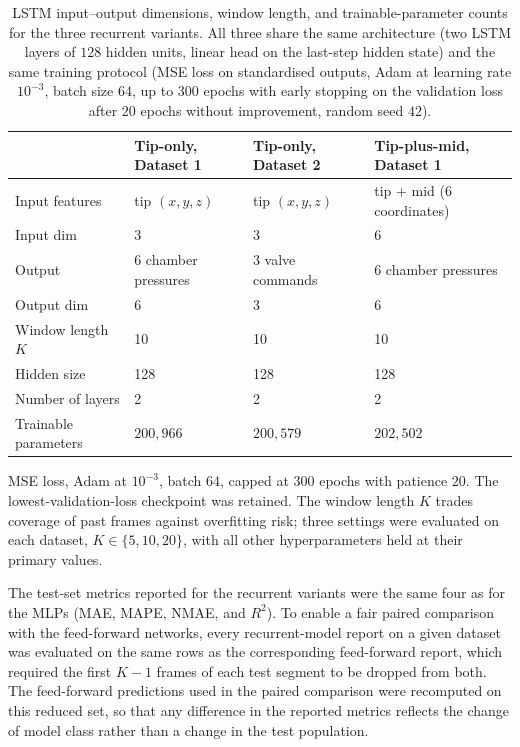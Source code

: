 \begin{table}[ht]
\centering
\caption[LSTM configurations for the three recurrent variants.]{LSTM input--output dimensions, window length, and trainable-parameter counts for the three recurrent variants. All three share the same architecture (two LSTM layers of $128$ hidden units, linear head on the last-step hidden state) and the same training protocol (MSE loss on standardised outputs, Adam at learning rate $10^{-3}$, batch size $64$, up to $300$ epochs with early stopping on the validation loss after $20$ epochs without improvement, random seed $42$).}
\label{tab:lstm_config}
\begin{tabularx}{\linewidth}{@{}l X X X@{}}
\toprule
                      & Tip-only, Dataset 1    & Tip-only, Dataset 2    & Tip-plus-mid, Dataset 1 \\
\midrule
Input features        & tip $(x,y,z)$          & tip $(x,y,z)$          & tip + mid ($6$ coordinates) \\
Input dim             & 3                       & 3                       & 6 \\
Output                & 6 chamber pressures    & 3 valve commands        & 6 chamber pressures \\
Output dim            & 6                       & 3                       & 6 \\
Window length $K$     & 10                      & 10                      & 10 \\
Hidden size           & 128                     & 128                     & 128 \\
Number of layers      & 2                       & 2                       & 2 \\
Trainable parameters  & $200{,}966$             & $200{,}579$             & $202{,}502$ \\
\bottomrule
\end{tabularx}
\end{table}

MSE loss, Adam at $10^{-3}$, batch $64$, capped at $300$ epochs with patience $20$. The lowest-validation-loss checkpoint was retained. The window length $K$ trades coverage of past frames against overfitting risk; three settings were evaluated on each dataset, $K \in \{5, 10, 20\}$, with all other hyperparameters held at their primary values.


The test-set metrics reported for the recurrent variants were the same four as for the MLPs (MAE, MAPE, NMAE, and $R^{2}$). To enable a fair paired comparison with the feed-forward networks, every recurrent-model report on a given dataset was evaluated on the same rows as the corresponding feed-forward report, which required the first $K-1$ frames of each test segment to be dropped from both. The feed-forward predictions used in the paired comparison were recomputed on this reduced set, so that any difference in the reported metrics reflects the change of model class rather than a change in the test population.

